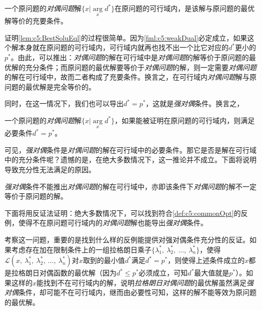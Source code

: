 \begin{lemma}[最优解的等价性] \label{lem:c5:BestSoluEql}
	一个原问题的\emph{对偶问题}解$\{x|\arg\limits_x d^{\ast}\}$在原问题的可行域内，是该解与原问题的最优解等价的充要条件。
\end{lemma}

证明\autoref{lem:c5:BestSoluEql}的过程很简单。因为\eqref{fml:c5:weakDual}必定成立，如果这个解本身就在原问题的可行域内，可行域内就再也找不出一个比它对应的$d^{\ast}$更小的$p^{\ast}$。由此，可以推出：\emph{对偶问题}的解在可行域中是\emph{对偶问题}的解等价于原问题的最优解的充分条件；而原问题的最优解要等价于\emph{对偶问题}的解，则一定需要\emph{对偶问题}的解在可行域中，故而二者构成了充要条件。换言之，在可行域内\emph{对偶问题}解与原问题的最优解是完全等价的。

同时，在这一情况下，我们也可以导出$d^{\ast}=p^{\ast}$，这就是\emph{强对偶}条件。换言之，

\begin{theorem}[对偶问题的解在可行域中的必要条件] \label{tho:c5:FeasibleDualNec}
	一个原问题的\emph{对偶问题}解$\{x|\arg\limits_x d^{\ast}\}$，如果能被证明在原问题的可行域内，则满足必要条件$d^{\ast}=p^{\ast}$。
\end{theorem}

可见，\emph{强对偶}条件是\emph{对偶问题}的解在可行域中的必要条件。那它是否是解在可行域中的充分条件呢？遗憾的是，在绝大多数情况下，这一推论并不成立。下面将说明导致充分性无法满足的原因。

\begin{lemma}[强对偶不是对偶问题在可行域中的充分条件] \label{lem:c5:FeasibleDualSuf}
	\emph{强对偶}条件不能推出\emph{对偶问题}的解在可行域中，亦即该条件下\emph{对偶问题}的解不一定等价于原问题的解。
\end{lemma}

下面将用反证法证明：绝大多数情况下，可以找到符合\autoref{def:c5:commonOpt}的反例，使得不在原问题可行域内的\emph{对偶问题}解也能导出\emph{强对偶}条件。

考察这一问题，重要的是找到什么样的反例能提供对强对偶条件充分性的反证。如果考虑存在加在限制条件上的一组拉格朗日乘子$\{\lambda_1^{\ast},~\lambda_2^{\ast},~\ldots,~\lambda_n^{\ast}\}$，使得$\mathcal{L}(x,~\lambda_1^{\ast},~\lambda_2^{\ast},~\ldots,~\lambda_n^{\ast})$对$x$取到的最小值$d^{\ast}$满足$d^{\ast}=p^{\ast}$，则使得上述条件成立的$x$都是拉格朗日对偶函数的最优解（因为$d^{\ast} \leqslant p^{\ast}$必须成立，可知$d^{\ast}$最大值就是$p^{\ast}$）。如果这样的$x$能找到不在可行域内的解，说明\emph{拉格朗日对偶问题}的最优解虽然满足\emph{强对偶}条件，却可能不在可行域内，继而由必要性可知，这样的解不能等效为原问题的最优解。

